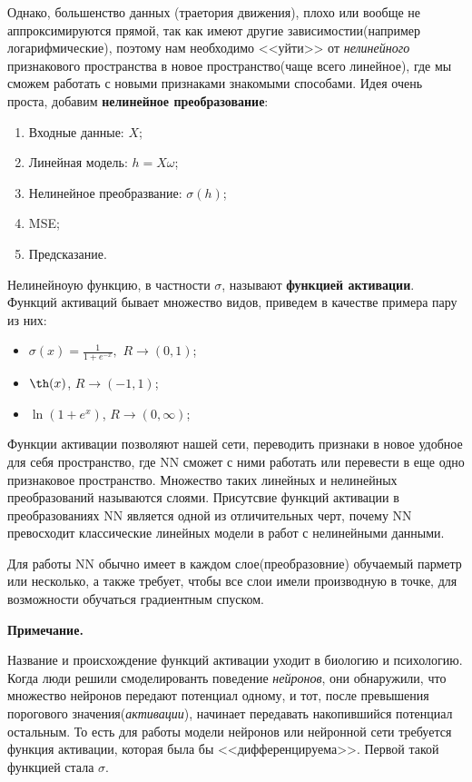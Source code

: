 \documentclass[a4paper,11pt]{article} %
\begin{document}
Однако, большенство данных (траетория движения), плохо или вообще не аппроксимируются прямой, так как имеют другие  зависимостии(например логарифмические),  поэтому нам необходимо <<уйти>>  от \textit{нелинейного} признакового пространства в новое пространство(чаще всего  линейное), где мы сможем работать  с  новыми  признаками  знакомыми способами.  Идея  очень проста,  добавим \textbf{нелинейное преобразование}:

\begin{enumerate}
\item Входные данные: $X$;
\item Линейная модель: $h=X\omega$;
\item Нелинейное преобразвание: $\sigma(h)$;
\item MSE;
\item Предсказание.
\end{enumerate}

Нелинейноую функцию, в частности $\sigma$,  называют \textbf{функцией  активации}. Функций активаций бывает множество  видов,  приведем в  качестве примера пару из них:

\begin{itemize}

\item $\sigma(x)=\frac{1}{1+e^{-x}},$ $R\longrightarrow(0,1)$;

\item $\th(x)$,  $R\longrightarrow(-1,1)$;

\item $\ln(1+e^x)$,  $R\longrightarrow(0,\infty)$;

\end{itemize}

Функции активации  позволяют  нашей сети,  переводить признаки  в новое  удобное для себя  пространство,  где NN сможет с ними работать или перевести в еще одно признаковое пространство.  Множество таких линейных и  нелинейных преобразований называются  слоями.  Присутсвие функций активации в преобразованиях NN является одной из отличительных черт,  почему NN превосходит классические линейных модели в работ с нелинейными данными.

Для работы NN обычно имеет в каждом слое(преобразовние) обучаемый парметр или несколько, а также требует, чтобы все слои имели производную в точке, для возможности  обучаться градиентным  спуском.

\textbf{Примечание.}

Название и происхождение функций активации уходит в биологию и психологию.  Когда люди решили смоделированть поведение  \textit{нейронов},  они обнаружили, что множество  нейронов передают  потенциал одному,  и тот, после превышения порогового значения(\textit{активации}),  начинает передавать накопившийся потенциал остальным.  То есть для работы модели нейронов  или нейронной сети требуется функция  активации,  которая была бы  <<дифференцируема>>.  Первой такой функцией стала  $\sigma$.
\end{document}
